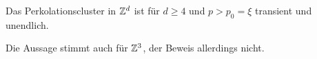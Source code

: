 \begin{korollar}
	Das Perkolationscluster in $\mathbb{Z}^d$ ist für $d \geq 4$ und $p > p_0 = \xi$ transient und unendlich. 
\end{korollar}
\begin{bemerkung}
	Die Aussage stimmt auch für $\mathbb{Z}^3$, der Beweis allerdings nicht.
\end{bemerkung}








 